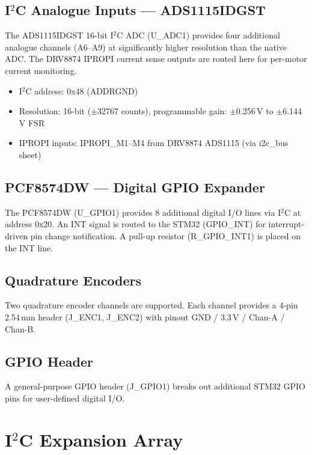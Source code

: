 \documentclass[11pt,a4paper]{article}
\begin{document}
\subsection{\texorpdfstring{I$^2$C}{I2C} Analogue Inputs --- ADS1115IDGST}

The ADS1115IDGST 16-bit I$^2$C ADC (U\_ADC1) provides four additional analogue channels (A6--A9) at significantly higher resolution than the native ADC. The DRV8874 IPROPI current sense outputs are routed here for per-motor current monitoring.

\begin{itemize}
  \item I$^2$C address: 0x48 (ADDR\textrightarrow{}GND)
  \item Resolution: 16-bit ($\pm$32767 counts), programmable gain: $\pm$0.256\,V to $\pm$6.144\,V FSR
  \item IPROPI inputs: IPROPI\_M1--M4 from DRV8874 \textrightarrow{} ADS1115 (via i2c\_bus sheet)
\end{itemize}

\subsection{PCF8574DW --- Digital GPIO Expander}

The PCF8574DW (U\_GPIO1) provides 8 additional digital I/O lines via I$^2$C at address 0x20. An INT signal is routed to the STM32 (GPIO\_INT) for interrupt-driven pin change notification. A pull-up resistor (R\_GPIO\_INT1) is placed on the INT line.

\subsection{Quadrature Encoders}

Two quadrature encoder channels are supported. Each channel provides a 4-pin 2.54\,mm header (J\_ENC1, J\_ENC2) with pinout GND / 3.3\,V / Chan-A / Chan-B.

\subsection{GPIO Header}

A general-purpose GPIO header (J\_GPIO1) breaks out additional STM32 GPIO pins for user-defined digital I/O.

\section{\texorpdfstring{I$^2$C}{I2C} Expansion Array}
\end{document}
